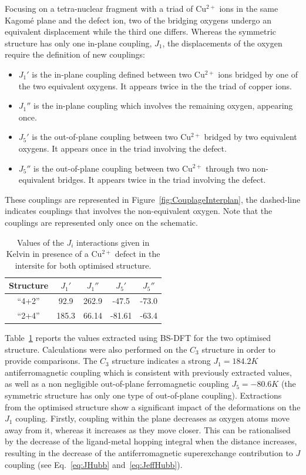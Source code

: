 \documentclass[12pt,a4paper]{report}
\numberwithin{equation}{section}
\begin{document}
Focusing on a tetra-nuclear fragment with a triad of Cu$^{2+}$ ions in the same Kagomé plane and the defect ion, two of the bridging oxygens undergo an equivalent displacement while the third one differs.
Whereas the symmetric structure has only one in-plane coupling, $J_1$, the displacements of the oxygen require the definition of new couplings:
\begin{itemize}
\item $J_1'$ is the in-plane coupling defined between two Cu$^{2+}$ ions bridged by one of the two equivalent oxygens. It appears twice in the the triad of copper ions.
\item $J_1''$ is the in-plane coupling which involves the remaining oxygen, appearing once.
\item $J_5'$ is the out-of-plane coupling between two Cu$^{2+}$ bridged by two equivalent oxygens. It appears once in the triad involving the defect.
\item $J_5''$ is the out-of-plane coupling between two Cu$^{2+}$ through two non-equivalent bridges. It appears twice in the triad involving the defect.
\end{itemize}
These couplings are represented in Figure~\ref{fig:CouplageInterplan}, the dashed-line indicates couplings that involves the non-equivalent oxygen.
Note that the couplings are represented only once on the schematic.

\begin{table}[!ht]
    \centering
    \begin{tabular}{c c c c c }
        \hline
        Structure & $J_1'$ & $J_1''$ & $J_5'$ & $J_5''$\\
        \hline
        ``4+2'' & 92.9 & 262.9 & -47.5 & -73.0\\
        ``2+4'' & 185.3 & 66.14 & -81.61 & -63.4\\
        \hline
    \end{tabular}
    \caption{Values of the $J_i$ interactions given in Kelvin in presence of a Cu$^{2+}$ defect in the intersite for both optimised structure.}
    \label{tab:DefautJ}
\end{table}



Table~\ref{tab:DefautJ} reports the values extracted using BS-DFT for the two optimised structure.
Calculations were also performed on the $C_3$ structure in order to provide comparisons.
The $C_3$ structure indicates a strong $J_1=184.2K$ antiferromagnetic coupling which is consistent with previously extracted values, as well as a non negligible out-of-plane ferromagnetic coupling $J_5=-80.6K$ (the symmetric structure has only one type of out-of-plane coupling). 
Extractions from the optimised structure show a significant impact of the deformations on the $J_1$ coupling.
Firstly, coupling within the plane decreases as oxygen atoms move away from it, whereas it increases as they move closer.
This can be rationalised by the decrease of the ligand-metal hopping integral when the distance increases, resulting in the decrease of the antiferromagnetic superexchange contribution to $J$ coupling (see Eq.~\ref{eq:JHubb} and~\ref{eq:JeffHubb}).
\end{document}
